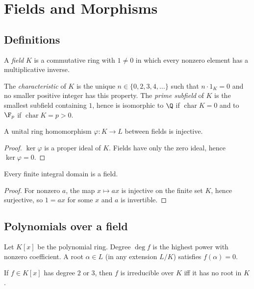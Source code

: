 \section{Fields and Morphisms}

\subsection{Definitions}
\begin{definition}[Field]
A \emph{field} $K$ is a commutative ring with $1\neq 0$ in which every nonzero element has a multiplicative inverse.
\end{definition}

\begin{definition}
The \emph{characteristic} of $K$ is the unique $n\in\{0,2,3,4,\dots\}$ such that $n\cdot 1_K=0$ and no smaller positive integer has this property.  
The \emph{prime subfield} of $K$ is the smallest subfield containing $1$, hence is isomorphic to $\Q$ if $\operatorname{char}K=0$ and to $\F_p$ if $\operatorname{char}K=p>0$.
\end{definition}

\begin{proposition}
A unital ring homomorphism $\varphi:K\to L$ between fields is injective. 
\end{proposition}
\begin{proof}
$\ker\varphi$ is a proper ideal of $K$. Fields have only the zero ideal, hence $\ker\varphi=0$.
\end{proof}

\begin{proposition}
Every finite integral domain is a field.
\end{proposition}
\begin{proof}
For nonzero $a$, the map $x\mapsto ax$ is injective on the finite set $K$, hence surjective, so $1=ax$ for some $x$ and $a$ is invertible.
\end{proof}

\subsection{Polynomials over a field}
Let $K[x]$ be the polynomial ring. Degree $\deg f$ is the highest power with nonzero coefficient. A root $\alpha\in L$ (in any extension $L/K$) satisfies $f(\alpha)=0$.

\begin{proposition}
If $f\in K[x]$ has degree $2$ or $3$, then $f$ is irreducible over $K$ iff it has no root in $K$.
\end{proposition}

